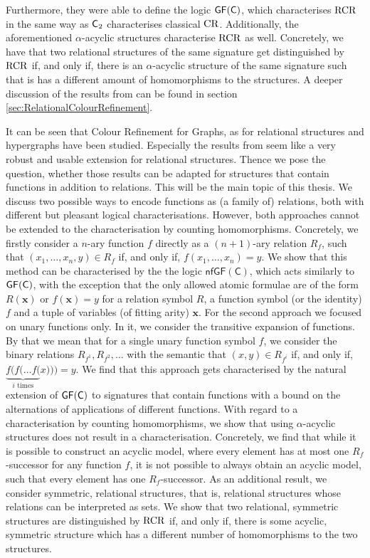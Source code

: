 Furthermore, they were able to define the logic $\mathsf{GF}(\mathsf{C})$, which characterises $\operatorname{RCR}$ in the same way as $\mathsf{C}_{2}$ characterises classical $\operatorname{CR}$.
Additionally, the aforementioned $\alpha$-acyclic structures characterise $\operatorname{RCR}$ as well.
Concretely, we have that two relational structures of the same signature get distinguished by $\operatorname{RCR}$ if, and only if, there is an $\alpha$-acyclic structure of the same signature such that is has a different amount of homomorphisms to the structures.
A deeper discussion of the results from \cite{scheidt2025ColorRefinement} can be found in section \ref{sec:RelationalColourRefinement}.

It can be seen that Colour Refinement for Graphs, as for relational structures and hypergraphs have been studied.
Especially the results from \cite{scheidt2025ColorRefinement} seem like a very robust and usable extension for relational structures.
Thence we pose the question, whether those results can be adapted for structures that contain functions in addition to relations.
This will be the main topic of this thesis.
We discuss two possible ways to encode functions as (a family of) relations, both with different but pleasant logical characterisations.
However, both approaches cannot be extended to the characterisation by counting homomorphisms.
Concretely, we firstly consider a $n$-ary function $f$ directly as a $(n+1)$-ary relation $R_f$, such that $(x_1,\dots,x_n,y)\in R_f$ if, and only if, $f(x_1,\dots,x_n)=y$.
We show that this method can be characterised by the the logic $\mathsf{nfGF}(\mathsf C)$, which acts similarly to $\mathsf{GF}(\mathsf{C})$, with the exception that the only allowed atomic formulae are of the form $R(\mathbf x)$ or $f(\mathbf x)=y$ for a relation symbol $R$, a function symbol (or the identity) $f$ and a tuple of variables (of fitting arity) $\mathbf x$.
For the second approach we focused on unary functions only.
In it, we consider the transitive expansion of functions.
By that we mean that for a single unary function symbol $f$, we consider the binary relations $R_{f^1},R_{f^2},\dots$ with the semantic that $(x,y)\in R_{f^i}$ if, and only if, $\underbrace{f(f(\dots f(}_{i \text{ times}}x)))=y$.
We find that this approach gets characterised by the natural extension of $\mathsf{GF}(\mathsf{C})$ to signatures that contain functions with a bound on the alternations of applications of different functions.
With regard to a characterisation by counting homomorphisms, we show that using $\alpha$-acyclic structures does not result in a characterisation.
Concretely, we find that while it is possible to construct an acyclic model, where every element has at most one $R_f$-successor for any function $f$, it is not possible to always obtain an acyclic model, such that every element has one $R_f$-successor.
As an additional result, we consider symmetric, relational structures, that is, relational structures whose relations can be interpreted as sets.
We show that two relational, symmetric structures are distinguished by $\operatorname{RCR}$ if, and only if, there is some acyclic, symmetric structure which has a different number of homomorphisms to the two structures.

